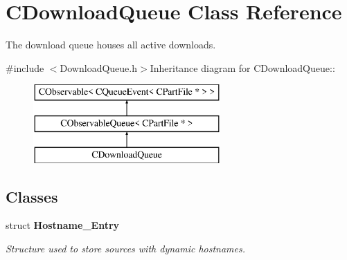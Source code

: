 \section{CDownloadQueue Class Reference}
\label{classCDownloadQueue}


The download queue houses all active downloads.  


{\ttfamily \#include $<$DownloadQueue.h$>$}Inheritance diagram for CDownloadQueue::\begin{figure}[H]
\begin{center}
\leavevmode
\includegraphics[height=3cm]{classCDownloadQueue}
\end{center}
\end{figure}
\subsection*{Classes}
\begin{DoxyCompactItemize}
\item 
struct {\bf Hostname\_\-Entry}
\begin{DoxyCompactList}\small\item\em Structure used to store sources with dynamic hostnames. \item\end{DoxyCompactList}\end{DoxyCompactItemize}
